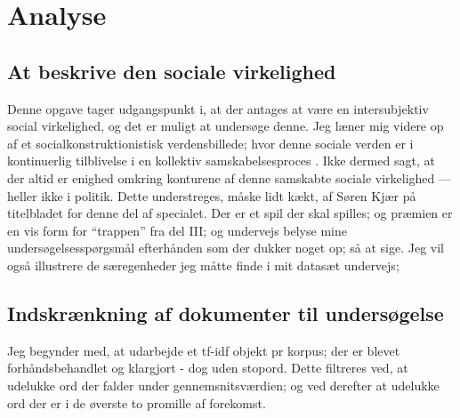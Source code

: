 \renewcommand*{\afterpartskip}{
\vfil
\begin{epigraphs}
\qitem{\itshape
“Jo, hvis dét skal kaldes Fakta, saa benægter a Fakta!”
}{folketingsmedlem Søren Kjær, i debat med Carl Steen Andersen Bille}
\qitem{\itshape
  Politik skal ikke videnskabeliggøres. Der findes ikke noget facit i politik – kun følelser og holdninger. Begreber som sandt og falsk eller godt og ondt har ganske enkelt ikke hjemme i det politiske rum. 
}{Peter Skaarup, i et ugebrev for Dansk Folkeparti, \citeyear{skaarupPolitikErForst2017}}
\end{epigraphs}}

\part{Analyse}\label{part:analysis}

\chapter{At beskrive den sociale virkelighed}


Denne opgave tager udgangspunkt i, at der antages at være en intersubjektiv social virkelighed, og det er muligt at undersøge denne.
Jeg læner mig videre op af et socialkonstruktionistisk verdensbillede; hvor denne sociale verden er i kontinuerlig tilblivelse i en kollektiv samskabelsesproces .
Ikke dermed sagt, at der altid er enighed omkring konturene af denne samskabte sociale virkelighed — heller ikke i politik.
Dette understreges, måske lidt kækt, af Søren Kjær på titelbladet for denne del af specialet.
Der er et spil der skal spilles; og præmien er en vis form for  “trappen” fra del III; og undervejs belyse mine undersøgelsesspørgsmål efterhånden som der dukker noget op; så at sige.
Jeg vil også illustrere de særegenheder jeg måtte finde i mit datasæt undervejs; 

\chapter{Indskrænkning af dokumenter til undersøgelse}

Jeg begynder med, at udarbejde et tf-idf objekt pr korpus; der er blevet forhåndsbehandlet og klargjort - dog uden stopord.
Dette filtreres ved, at udelukke ord der falder under gennemsnitsværdien; og ved derefter at udelukke ord der er i de øverste to promille af forekomst.

